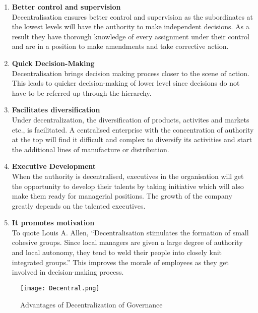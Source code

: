 \begin{enumerate}

\item \textbf{Better control and supervision} \\
Decentralisation ensures better control and supervision as the subordinates at the lowest levels will have the authority to make independent decisions. As a result they have thorough knowledge of every assignment under their control and are in a position to make amendments and take corrective action.

\item \textbf{Quick Decision-Making} \\
Decentralisation brings decision making process closer to the scene of action. This leads to quicker decision-making of lower level since decisions do not have to be referred up through the hierarchy.

\item \textbf{Facilitates diversification}\\
Under decentralization, the diversification of products, activites and markets etc., is facilitated. A centralised enterprise with the concentration of authority at the top will find it difficult and complex to diversify its activities and start the additional lines of manufacture or distribution.

\item \textbf{Executive Development}\\
When the authority is decentralised, executives in the organisation will get the opportunity to develop their talents by taking initiative which will also make them ready for managerial positions. The growth of the company greatly depends on the talented executives.

\item \textbf{It promotes motivation}\\
To quote Louis A. Allen, “Decentralisation stimulates the formation of small cohesive groups. Since local managers are given a large degree of authority and local autonomy, they tend to weld their people into closely knit integrated groups.” This improves the morale of employees as they get involved in decision-making process.

\end{enumerate}

\begin{figure}[H]
    \centering
	\texttt{[image: Decentral.png]}
    \caption{ Advantages of Decentralization of Governance }
    \label{fig:Advantages of Decentralization of Governance}
\end{figure}

